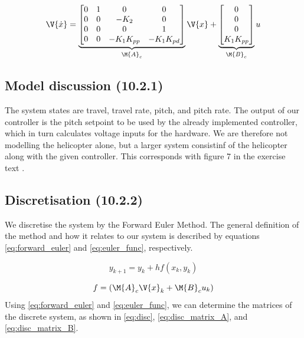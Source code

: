 \begin{equation}\label{eq:state_space_matrices}
	\V{\dot{x}} =
	\underbrace{
		\begin{bmatrix}
			0 & 1 & 0 				& 0 \\
			0 & 0 & -K_{2} 			& 0 \\
			0 & 0 & 0 				& 1 \\
			0 & 0 & -K_{1}K_{pp}	& -K_{1}K_{pd}
		\end{bmatrix}
	}_{\M{A}_{c}}
	\V{x} +
	\underbrace{
		\begin{bmatrix}
			0 \\ 0 \\ 0 \\ K_{1}K_{pp}
		\end{bmatrix}
	}_{\M{B}_{c}}
	u
\end{equation}


\subsection{Model discussion (10.2.1)}
The system states are travel, travel rate, pitch, and pitch rate. The output of our controller is the pitch setpoint to be used by the already implemented controller, which in turn calculates voltage inputs for the hardware. We are therefore not modelling the helicopter alone, but a larger system consistinf of the helicopter along with the given controller. This corresponds with figure 7 in the exercise text \cite{_helicopter_2015}.


\subsection{Discretisation (10.2.2)}\label{sec:disc1}
We discretise the system by the Forward Euler Method. The general definition of the method and how it relates to our system is described by equations \eqref{eq:forward_euler} and \eqref{eq:euler_func}, respectively.

\begin{equation}\label{eq:forward_euler}
	y_{k+1} = y_{k} + h f(x_{k}, y_{k})
\end{equation}

\begin{equation}\label{eq:euler_func}
	f = \left( \M{A}_{c} \V{x}_{k} + \M{B}_c u_{k} \right)
\end{equation}
Using \eqref{eq:forward_euler} and \eqref{eq:euler_func}, we can determine the matrices of the discrete system, as shown in \eqref{eq:disc}, \eqref{eq:disc_matrix_A}, and \eqref{eq:disc_matrix_B}.

